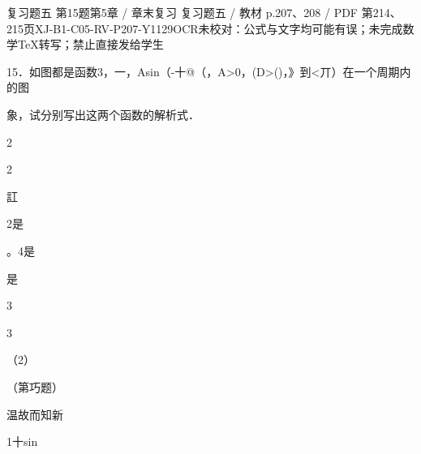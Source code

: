 \begin{bankitem}{复习题五 第15题}{第5章 / 章末复习 复习题五 / 教材 p.207、208 / PDF 第214、215页}{XJ-B1-C05-RV-P207-Y1129}{OCR未校对：公式与文字均可能有误；未完成数学TeX转写；禁止直接发给学生}
\begin{ocrdraft}
\par
15．如图都是函数3，一，Asin（-十@（，A>0，(D>()，》到<丌）在一个周期内的图
\par
象，试分别写出这两个函数的解析式．
\par
2
\par
2
\par
訌
\par
2是
\par
。4是
\par
是
\par
3
\par
3
\par
（2）
\par
（第巧题）
\par
[教材p.208 / PDF第215页]
\par
温故而知新
\par
1十sin
\end{ocrdraft}
\end{bankitem}
